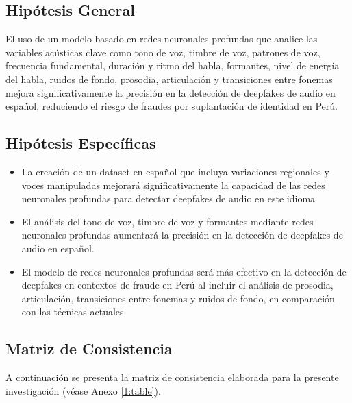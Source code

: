 \subsection{Hipótesis General}
\newcommand{\HipotesisGeneral}{
El uso de un modelo basado en redes neuronales profundas que analice las variables acústicas clave como tono de voz, timbre de voz, patrones de voz, frecuencia fundamental, duración y ritmo del habla, formantes, nivel de energía del habla, ruidos de fondo, prosodia, articulación y transiciones entre fonemas mejora significativamente la precisión en la detección de deepfakes de audio en español, reduciendo el riesgo de fraudes por suplantación de identidad en Perú.
}
\HipotesisGeneral
\subsection{Hipótesis Específicas}
\newcommand{\Hone}{
La creación de un dataset en español que incluya variaciones regionales y voces manipuladas mejorará significativamente la capacidad de las redes neuronales profundas para detectar deepfakes de audio en este idioma
}
\newcommand{\Htwo}{
El análisis del tono de voz, timbre de voz y formantes mediante redes neuronales profundas aumentará la precisión en la detección de deepfakes de audio en español.
}
\newcommand{\Hthree}{
El modelo de redes neuronales profundas será más efectivo en la detección de deepfakes en contextos de fraude en Perú al incluir el análisis de prosodia, articulación, transiciones entre fonemas y ruidos de fondo, en comparación con las técnicas actuales.	
}

\begin{itemize}
	\item \Hone
	\item \Htwo
	\item \Hthree
\end{itemize}

\subsection{Matriz de Consistencia}
A continuación se presenta la matriz de consistencia elaborada para la presente investigación (véase Anexo \ref{1:table}).

